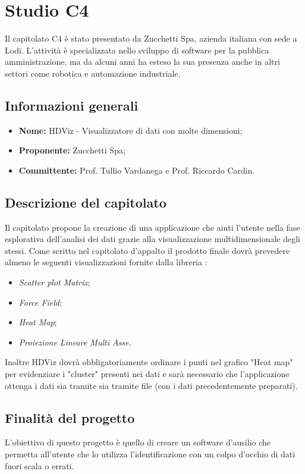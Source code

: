 \section{Studio C4}
Il capitolato C4 è stato presentato da Zucchetti Spa, azienda italiana con sede a Lodi. L'attività è specializzata nello sviluppo di software per la pubblica amministrazione, ma da alcuni anni ha esteso la sua presenza anche in altri settori come robotica e automazione industriale.

\subsection{Informazioni generali}
\begin{itemize}
    \item \textbf{Nome:} HDViz - Visualizzatore di dati con molte dimensioni;
    \item \textbf{Proponente:} Zucchetti Spa;
    \item \textbf{Committente:} Prof. Tullio Vardanega e Prof. Riccardo Cardin.
\end{itemize}

\subsection{Descrizione del capitolato}
Il capitolato propone la creazione di una applicazione che aiuti l'utente nella fase esplorativa dell'analisi dei dati grazie alla visualizzazione multidimensionale degli stessi.
Come scritto nel capitolato d'appalto il prodotto finale dovrà prevedere almeno le seguenti visualizzazioni fornite dalla libreria \textit{}:
\begin{itemize}
    \item \textit{Scatter plot Matrix};
    \item \textit{Force Field};
    \item \textit{Heat Map};
    \item \textit{Proiezione Lineare Multi Asse}.
\end{itemize}
Inoltre HDViz dovrà obbligatoriamente ordinare i punti nel grafico "Heat map" per evidenziare i "cluster" presenti nei dati e sarà necessario che l'applicazione ottenga i dati sia tramite  sia tramite file  (con i dati precedentemente preparati).

\subsection{Finalità del progetto}
L'obiettivo di questo progetto è quello di creare un software d'ausilio che permetta all'utente che lo utilizza l'identificazione con un colpo d'occhio di dati fuori scala o errati.

